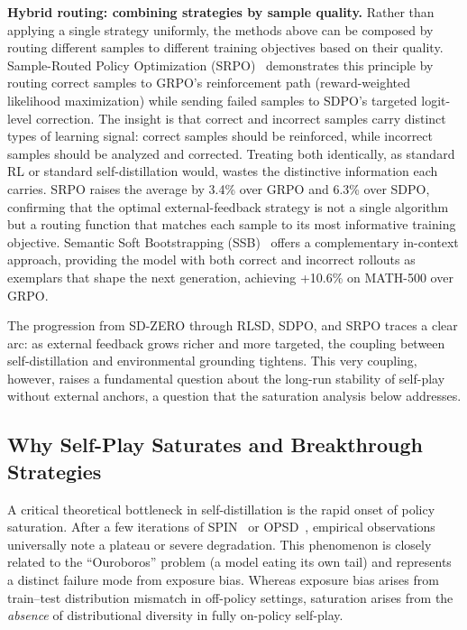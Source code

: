 \documentclass{article} %
\begin{document}
\textbf{Hybrid routing: combining strategies by sample quality.}
Rather than applying a single strategy uniformly, the methods above can be composed by routing different samples to different training objectives based on their quality. Sample-Routed Policy Optimization (SRPO)~\citep{li2026unifying} demonstrates this principle by routing correct samples to GRPO's reinforcement path (reward-weighted likelihood maximization) while sending failed samples to SDPO's targeted logit-level correction. The insight is that correct and incorrect samples carry distinct types of learning signal: correct samples should be reinforced, while incorrect samples should be analyzed and corrected. Treating both identically, as standard RL or standard self-distillation would, wastes the distinctive information each carries. SRPO raises the average by 3.4\% over GRPO and 6.3\% over SDPO, confirming that the optimal external-feedback strategy is not a single algorithm but a routing function that matches each sample to its most informative training objective. Semantic Soft Bootstrapping (SSB)~\citep{mitra2025semantic} offers a complementary in-context approach, providing the model with both correct and incorrect rollouts as exemplars that shape the next generation, achieving +10.6\% on MATH-500 over GRPO.

The progression from SD-ZERO through RLSD, SDPO, and SRPO traces a clear arc: as external feedback grows richer and more targeted, the coupling between self-distillation and environmental grounding tightens. This very coupling, however, raises a fundamental question about the long-run stability of self-play without external anchors, a question that the saturation analysis below addresses.


\subsection*{Why Self-Play Saturates and Breakthrough Strategies}

\label{subsec:saturation_analysis}

A critical theoretical bottleneck in self-distillation is the rapid onset of policy saturation. After a few iterations of SPIN~\citep{2401.01335} or OPSD~\citep{2601.18734}, empirical observations universally note a plateau or severe degradation. This phenomenon is closely related to the ``Ouroboros'' problem (a model eating its own tail) and represents a distinct failure mode from exposure bias. Whereas exposure bias arises from train--test distribution mismatch in off-policy settings, saturation arises from the \emph{absence} of distributional diversity in fully on-policy self-play.
\end{document}
